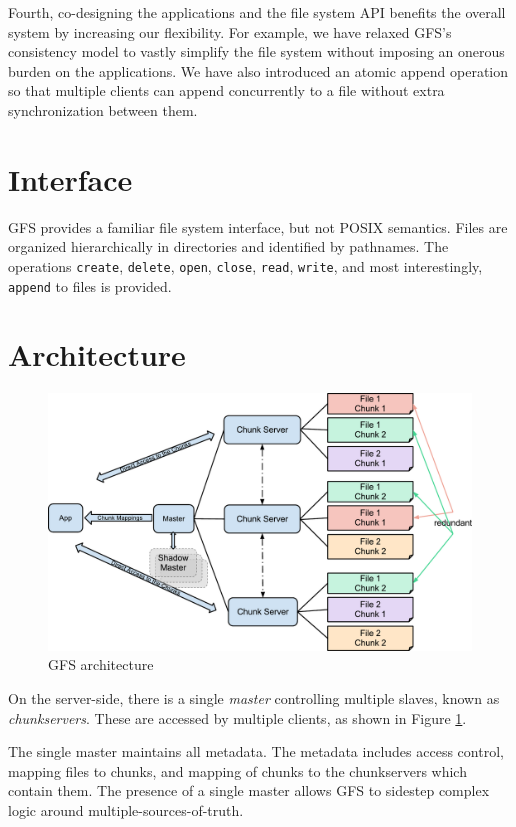 \documentclass{article}
\begin{document}
Fourth, co-designing the applications and the file system API benefits the
overall system by increasing our flexibility.  For example, we have relaxed
GFS’s consistency model to vastly simplify the file system without imposing an
onerous burden on the applications. We have also introduced an atomic append
operation so that multiple clients can append concurrently to a file without
extra synchronization between them. 

 \section{Interface}
 GFS provides a familiar file system interface, but not POSIX semantics.
 Files are organized hierarchically in directories
 and identified by pathnames. The operations \texttt{create},
 \texttt{delete}, \texttt{open}, \texttt{close}, \texttt{read}, \texttt{write},
 and most interestingly, \texttt{append} to files is provided.

\section{Architecture}

\begin{figure}
\includegraphics[width=\textwidth]{gfs-diagram.pdf}
\caption{GFS architecture}
\label{fig:architecture}
\end{figure}

On the server-side, there is a single \emph{master} controlling multiple slaves,
known as \emph{chunkservers}. These are accessed by multiple clients, as
shown in  Figure \ref{fig:architecture}.

The single master maintains all metadata. The metadata includes access control,
mapping files to chunks, and mapping of chunks to the chunkservers which
contain them.  The presence of a single master allows GFS to sidestep complex
logic around multiple-sources-of-truth. 
\end{document}
